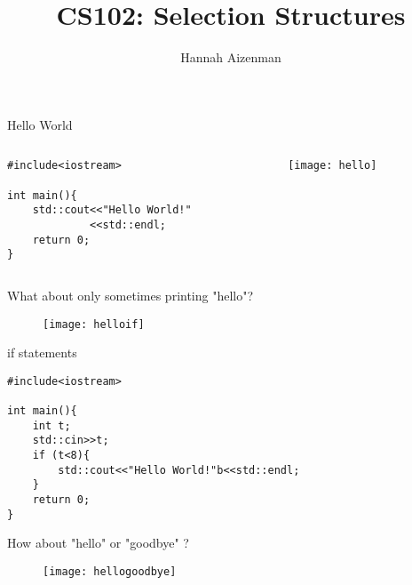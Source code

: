 \documentclass[xcolor={dvipsnames}]{beamer}
\begin{document}
\title{ CS102: Selection Structures}
\author{Hannah Aizenman}


\begin{frame}
	\titlepage
\end{frame}

\begin{frame}[fragile]{Hello World}
\begin{columns}
\begin{column}{0.5\textwidth}
\begin{verbatim}
#include<iostream>

int main(){
    std::cout<<"Hello World!"
             <<std::endl;
    return 0;
}
\end{verbatim}
  \end{column}
  \begin{column}{0.5\textwidth}
	\pause
	\begin{figure}
		\texttt{[image: hello]}
	\end{figure}
  \end{column}
\end{columns}
\end{frame}

\begin{frame}{ What about only sometimes printing "hello"?}
	\pause
	\begin{center}
	\begin{figure}
		\texttt{[image: helloif]}
	\end{figure}
	\end{center}
\end{frame}

\begin{frame}[fragile]{if statements}
\begin{verbatim}
#include<iostream>

int main(){
    int t;
    std::cin>>t;
    if (t<8){
        std::cout<<"Hello World!"b<<std::endl;
    }
    return 0;
}
\end{verbatim}
\end{frame}

\begin{frame}{How about "hello" or "goodbye" ?}
	\pause
	\begin{center}
	\begin{figure}
		\texttt{[image: hellogoodbye]}
	\end{figure}
	\end{center}
\end{frame}
\end{document}
